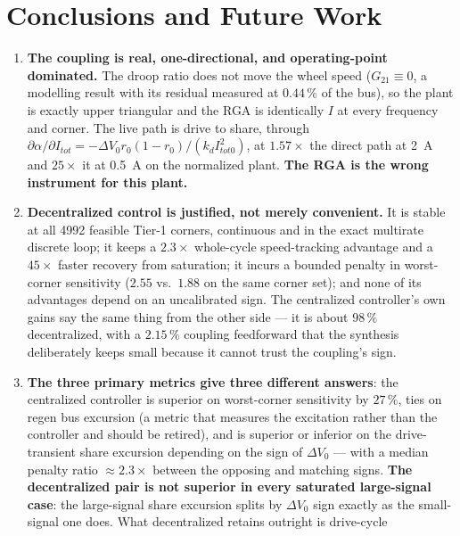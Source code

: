 \documentclass[energies,article,submit,pdftex,oneauthor]{Definitions/mdpi}
\begin{document}
\section{Conclusions and Future Work}
\label{sec:conclusions}

\begin{enumerate}
\item \textbf{The coupling is real, one-directional, and operating-point dominated.} The droop
      ratio does not move the wheel speed ($G_{21}\equiv0$, a modelling result with its residual
      measured at $0.44\,\%$ of the bus), so the plant is exactly upper triangular and the RGA is
      identically $I$ at every frequency and corner. The live path is drive to share, through
      $\partial\alpha/\partial I_{tot} = -\Delta V_0 r_0(1-r_0)/(k_d I_{tot0}^2)$, at
      $1.57\times$ the direct path at \SI{2}{\ampere} and $25\times$ it at \SI{0.5}{\ampere} on
      the normalized plant. \textbf{The RGA is the wrong instrument for this plant.}
\item \textbf{Decentralized control is justified, not merely convenient.} It is stable at all
      4992 feasible Tier-1 corners, continuous and in the exact multirate discrete loop; it keeps
      a $2.3\times$ whole-cycle speed-tracking advantage and a $45\times$ faster recovery from
      saturation; it incurs a bounded penalty in worst-corner sensitivity ($2.55$ vs.\ $1.88$ on the
      same corner set); and none of its advantages depend on an uncalibrated sign. The
      centralized controller's own gains say the same thing from the other side --- it is about
      $98\,\%$ decentralized, with a $2.15\,\%$ coupling feedforward that the synthesis
      deliberately keeps small because it cannot trust the coupling's sign.
\item \textbf{The three primary metrics give three different answers}: the centralized
      controller is superior on worst-corner
      sensitivity by $27\,\%$, ties on regen bus excursion (a metric that measures the
      excitation rather than the controller and should be retired), and is superior or inferior
      on the drive-transient share excursion depending on
      the sign of $\Delta V_0$ --- with a median penalty ratio $\approx2.3\times$ between the
      opposing and matching signs. \textbf{The decentralized pair is not
      superior in every saturated large-signal case}: the large-signal share excursion splits by $\Delta V_0$ sign
      exactly as the small-signal one does. What decentralized retains outright is drive-cycle

\end{enumerate}
\end{document}
